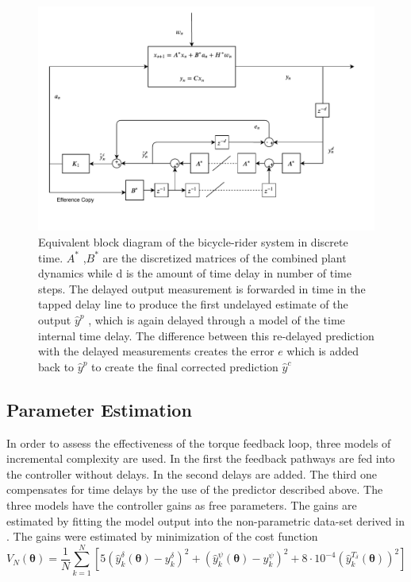  \begin{figure}[ht]
    \centering
    \captionsetup{justification=centering,margin=2cm}

    \includegraphics[scale=0.6]{images/discrete_block.pdf}
    \caption{Equivalent block diagram of the bicycle-rider system in discrete time. \ensuremath{A^*} ,\ensuremath{B^*} are the discretized matrices of the combined plant dynamics while d is the amount of time delay in number of time steps. The delayed output measurement is forwarded in time in the tapped delay line to produce the first undelayed estimate of the output \ensuremath{\hat{y}^p} , which is again delayed through a model of the time internal time delay. The difference between this re-delayed prediction with the delayed measurements creates the error \ensuremath{e} which is added back to  \ensuremath{\hat{y}^p}  to create the final corrected prediction \ensuremath{\hat{y}^c} }
    \label{fig:paper4}
\end{figure}

\subsection{Parameter Estimation }

In order to assess the effectiveness of the torque feedback loop, three models of incremental complexity are used. In the first the feedback pathways are fed into the controller without delays. In the second delays are added. The third one compensates for time delays by the use of the predictor described above. The three models have the  controller gains as free parameters. The gains are estimated by fitting the model output into the non-parametric data-set derived in \cite{dialynaseffect}.  The gains were estimated by minimization of the cost function 
\begin{equation}
    V_{N}(\boldsymbol{\theta})=\frac{1}{N} \sum_{k=1}^{N}\left[5\left(\hat{y}^{\delta}_k(\mathbf{\theta})-y^\delta_k\right)^{2}+\left(\hat{y}^{\psi}_k(\mathbf{\theta})-y^\psi_k\right)^{2}+8\cdot10^{-4}\left(\hat{y}^{T_\delta}_k(\mathbf{\theta})\right)^2\right]
    \label{eq:cost}
    \end{equation}

